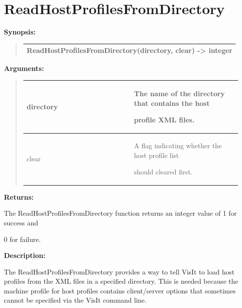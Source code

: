 \documentclass[letterpaper,10pt,english]{sphinxmanual}
\begin{document}
\section{ReadHostProfilesFromDirectory}
\label{functions:readhostprofilesfromdirectory}
\begin{DUlineblock}{0em}
\item[] \textbf{Synopsis:}
\end{DUlineblock}
\begin{quote}

\begin{tabulary}{\linewidth}{|L|}
\hline

ReadHostProfilesFromDirectory(directory, clear) -\textgreater{} integer
\\
\hline\end{tabulary}

\end{quote}

\begin{DUlineblock}{0em}
\item[] 
\item[] \textbf{Arguments:}
\end{DUlineblock}
\begin{quote}

\begin{tabular}{|p{0.475\linewidth}|p{0.475\linewidth}|}
\hline

directory
 & 
\begin{DUlineblock}{0em}
\item[] The name of the directory that contains the host
\item[] profile XML files.
\end{DUlineblock}
\\
\hline
clear
 & 
\begin{DUlineblock}{0em}
\item[] A flag indicating whether the host profile list
\item[] should cleared first.
\end{DUlineblock}
\\
\hline\end{tabular}

\end{quote}

\begin{DUlineblock}{0em}
\item[] 
\item[] \textbf{Returns:}
\item[] The ReadHostProfilesFromDirectory function returns an integer value of 1 for success and
\item[] 0 for failure.
\item[] 
\item[] \textbf{Description:}
\item[] The ReadHostProfilesFromDirectory provides a way to tell VisIt to load host
profiles from the XML files in a specified directory. This is needed because
the machine profile for host profiles contains client/server options that
sometimes cannot be specified via the VisIt command line.
\end{DUlineblock}
\end{document}
